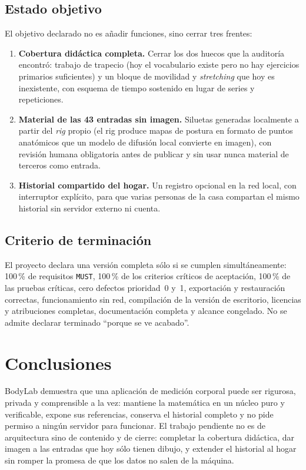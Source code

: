 \documentclass[conference]{IEEEtran}
\newcommand{\code}[1]{\texttt{\small #1}}
\begin{document}
\subsection{Estado objetivo}
El objetivo declarado no es a\~nadir funciones, sino cerrar tres frentes:
\begin{enumerate}
  \item \textbf{Cobertura did\'actica completa.} Cerrar los dos huecos que la
  auditor\'ia encontr\'o: trabajo de trapecio (hoy el vocabulario existe pero no
  hay ejercicios primarios suficientes) y un bloque de movilidad y
  \emph{stretching} que hoy es inexistente, con esquema de tiempo sostenido en
  lugar de series y repeticiones.
  \item \textbf{Material de las 43 entradas sin imagen.} Siluetas generadas
  localmente a partir del \emph{rig} propio (el rig produce mapas de postura en
  formato de puntos anat\'omicos que un modelo de difusi\'on local convierte en
  imagen), con revisi\'on humana obligatoria antes de publicar y sin usar nunca
  material de terceros como entrada.
  \item \textbf{Historial compartido del hogar.} Un registro opcional en la red
  local, con interruptor expl\'icito, para que varias personas de la casa
  compartan el mismo historial sin servidor externo ni cuenta.
\end{enumerate}

\subsection{Criterio de terminación}
El proyecto declara una versi\'on completa s\'olo si se cumplen
simult\'aneamente: 100\,\% de requisitos \code{MUST}, 100\,\% de los criterios
cr\'iticos de aceptaci\'on, 100\,\% de las pruebas cr\'iticas, cero defectos
prioridad~0 y~1, exportaci\'on y restauraci\'on correctas, funcionamiento sin
red, compilaci\'on de la versi\'on de escritorio, licencias y atribuciones
completas, documentaci\'on completa y alcance congelado. No se admite declarar
terminado ``porque se ve acabado''.

\section{Conclusiones}
BodyLab demuestra que una aplicaci\'on de medici\'on corporal puede ser
rigurosa, privada y comprensible a la vez: mantiene la matem\'atica en un
n\'ucleo puro y verificable, expone sus referencias, conserva el historial
completo y no pide permiso a ning\'un servidor para funcionar. El trabajo
pendiente no es de arquitectura sino de contenido y de cierre: completar la
cobertura did\'actica, dar imagen a las entradas que hoy s\'olo tienen dibujo, y
extender el historial al hogar sin romper la promesa de que los datos no salen
de la m\'aquina.
\end{document}
